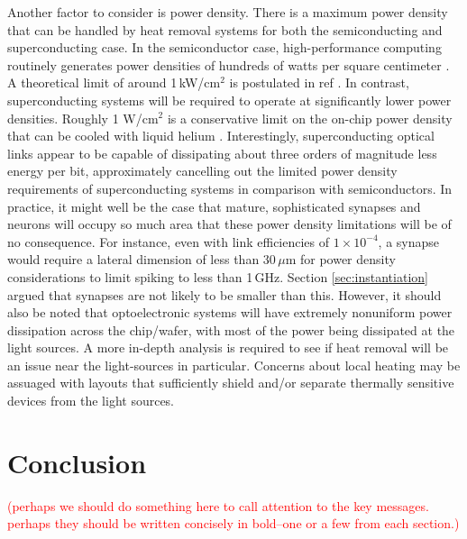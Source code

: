 \documentclass[twocolumn]{article}
\begin{document}
Another factor to consider is power density. There is a maximum power density that can be handled by heat removal systems for both the semiconducting and superconducting case. In the semiconductor case, high-performance computing routinely generates power densities of hundreds of watts per square centimeter \cite{tolpygo2016superconductor}. A theoretical limit of around 1\,kW/cm$^2$ is postulated in ref \cite{zhirnov2003limits}. In contrast, superconducting systems will be required to operate at significantly lower power densities. Roughly 1 W/cm$^2$ is a conservative limit on the on-chip power density that can be cooled with liquid helium \cite{tolpygo2016superconductor}. Interestingly, superconducting optical links appear to be capable of dissipating about three orders of magnitude less energy per bit, approximately cancelling out the limited power density requirements of superconducting systems in comparison with semiconductors. In practice, it might well be the case that mature, sophisticated synapses and neurons will occupy so much area that these power density limitations will be of no consequence. For instance, even with link efficiencies of $1 \times 10^{-4}$, a synapse would require a lateral dimension of less than 30\,$\mu$m for power density considerations to limit spiking to less than 1\,GHz. Section \ref{sec:instantiation} argued that synapses are not likely to be smaller than this. However, it should also be noted that optoelectronic systems will have extremely nonuniform power dissipation across the chip/wafer, with most of the power being dissipated at the light sources. A more in-depth analysis is required to see if heat removal will be an issue near the light-sources in particular. Concerns about local heating may be assuaged with layouts that sufficiently shield and/or separate thermally sensitive devices from the light sources.

\section{\label{sec:conclusion}Conclusion}

\textcolor{red}{(perhaps we should do something here to call attention to the key messages. perhaps they should be written concisely in bold--one or a few from each section.)}
\end{document}
